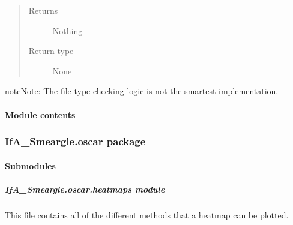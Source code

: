 \documentclass[letterpaper,10pt,english]{sphinxmanual}
\begin{document}
\begin{fulllineitems}
\begin{quote}
\begin{description}
\begin{itemize}
\end{itemize}

\item[{Returns}] \leavevmode
{} \textendash{} Nothing

\item[{Return type}] \leavevmode
None

\end{description}\end{quote}

\begin{sphinxadmonition}{note}{Note:}
The file type checking logic is not the smartest implementation.
\end{sphinxadmonition}

\end{fulllineitems}



\paragraph{Module contents}
\label{\detokenize{python_docstrings/IfA_Smeargle.meta:module-IfA_Smeargle.meta}}\label{\detokenize{python_docstrings/IfA_Smeargle.meta:module-contents}}

\subsubsection{IfA\_Smeargle.oscar package}
\label{\detokenize{python_docstrings/IfA_Smeargle.oscar:ifa-smeargle-oscar-package}}\label{\detokenize{python_docstrings/IfA_Smeargle.oscar::doc}}

\paragraph{Submodules}
\label{\detokenize{python_docstrings/IfA_Smeargle.oscar:submodules}}

\subparagraph{IfA\_Smeargle.oscar.heatmaps module}
\label{\detokenize{python_docstrings/IfA_Smeargle.oscar.heatmaps:module-IfA_Smeargle.oscar.heatmaps}}\label{\detokenize{python_docstrings/IfA_Smeargle.oscar.heatmaps:ifa-smeargle-oscar-heatmaps-module}}\label{\detokenize{python_docstrings/IfA_Smeargle.oscar.heatmaps::doc}}
This file contains all of the different methods that a heatmap can be plotted.
\end{document}
